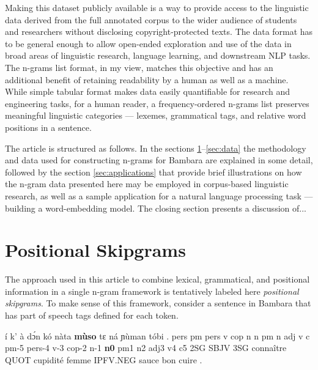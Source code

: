 \documentclass[12pt]{article}
\begin{document}
Making this dataset publicly available is a way to provide access to
the linguistic data derived from the full annotated corpus to the
wider audience of students and researchers without disclosing
copyright-protected texts. The data format has to be general enough to
allow open-ended exploration and use of the data in broad areas of
linguistic research, language learning, and downstream NLP tasks.  The
n-grams list format, in my view, matches this objective and has an
additional benefit of retaining readability by a human as well as a
machine. While simple tabular format makes data easily quantifiable
for research and engineering tasks, for a human reader, a
frequency-ordered n-grams list preserves meaningful linguistic
categories — lexemes, grammatical tags, and relative word positions in
a sentence. %


The article is structured as follows. In the sections
\ref{sec:definition}--\ref{sec:data} the methodology and data used for
constructing n-grams for Bambara are explained in some detail,
followed by the section \ref{sec:applications} that provide brief
illustrations on how the n-gram data presented here may be employed in
corpus-based linguistic research, as well as a sample application for
a natural language processing task — building a word-embedding model.
The closing section presents a discussion of...


\section{Positional Skipgrams}
\label{sec:definition}

The approach used in this article to combine lexical, grammatical, and
positional information in a single n-gram framework is tentatively
labeled here \textit{positional skipgrams}.  To make sense of this
framework, consider a sentence in Bambara that has part of speech tags
defined for each token.

\begin{example}
  \label{ex:muso}
  \trigloss
  {í       k'      à       dɔ́n     kó      nàta    \textbf{mùso}    tɛ      ná      ɲùman   tóbi    .}
  {pers    pm      pers    v       cop     n       n       pm      n       adj     v       c}
  {{} pm-5 pers-4 v-3 cop-2 n-1 \textbf{n0} pm1 n2 adj3 v4 c5}
  {2SG     SBJV    3SG     connaître       QUOT    cupidité        femme IPFV.NEG        sauce   bon     cuire   .}
\end{example}
\end{document}
